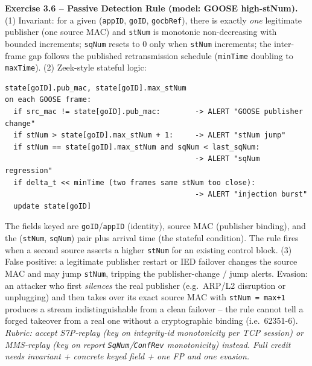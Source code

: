 \documentclass[11pt,a4paper]{article}
\begin{document}
\begin{solutionbox}
\textbf{Exercise 3.6 -- Passive Detection Rule (model: GOOSE high-stNum).}
(1) Invariant: for a given (\texttt{appID}, \texttt{goID},
\texttt{gocbRef}), there is exactly \emph{one} legitimate publisher (one
source MAC) and \texttt{stNum} is monotonic non-decreasing with bounded
increments; \texttt{sqNum} resets to 0 only when \texttt{stNum} increments;
the inter-frame gap follows the published retransmission schedule
(\texttt{minTime} doubling to \texttt{maxTime}).
(2) Zeek-style stateful logic:
\begin{lstlisting}[language={}]
state[goID].pub_mac, state[goID].max_stNum
on each GOOSE frame:
  if src_mac != state[goID].pub_mac:        -> ALERT "GOOSE publisher change"
  if stNum > state[goID].max_stNum + 1:     -> ALERT "stNum jump"
  if stNum == state[goID].max_stNum and sqNum < last_sqNum:
                                            -> ALERT "sqNum regression"
  if delta_t << minTime (two frames same stNum too close):
                                            -> ALERT "injection burst"
  update state[goID]
\end{lstlisting}
The fields keyed are \texttt{goID}/\texttt{appID} (identity), source MAC
(publisher binding), and the (\texttt{stNum}, \texttt{sqNum}) pair plus
arrival time (the stateful condition). The rule fires when a second source
asserts a higher \texttt{stNum} for an existing control block.
(3) False positive: a legitimate publisher restart or IED failover changes
the source MAC and may jump \texttt{stNum}, tripping the publisher-change /
jump alerts. Evasion: an attacker who first \emph{silences} the real
publisher (e.g.\ ARP/L2 disruption or unplugging) and then takes over its
exact source MAC with \texttt{stNum = max+1} produces a stream
indistinguishable from a clean failover -- the rule cannot tell a forged
takeover from a real one without a cryptographic binding (i.e.\ 62351-6).
\textit{Rubric: accept S7P-replay (key on integrity-id monotonicity per TCP
session) or MMS-replay (key on report \texttt{SqNum}/\texttt{ConfRev}
monotonicity) instead. Full credit needs invariant + concrete keyed field +
one FP and one evasion.}
\end{solutionbox}
\end{document}
